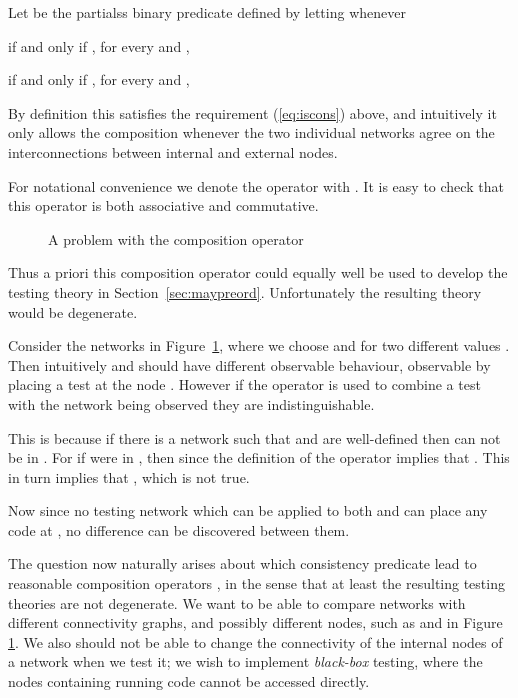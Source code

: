 \documentclass{LMCS}
\begin{document}
\begin{exa}\label{ex:mas.op}
  Let  be the partialss binary predicate defined by letting 
 whenever
\begin{itemise}
\item 
\item    if and only if 
 , for every  and , 
 \item  if and only if 
 , for every  and ,
\end{itemise}

\noindent By definition this satisfies the requirement (\ref{eq:iscons}) above,
and intuitively it only allows the composition whenever the two
individual networks agree on the interconnections between internal and external nodes.

For notational convenience we denote the operator  with 
. It is easy to check that this operator 
is both associative and commutative.
\end{exa}



\begin{figure}[t]                                 


  \caption{A problem with the  composition operator}
\label{fig:counterex} 
 
\end{figure}

Thus a priori this composition operator  could equally well 
be used to develop the testing theory in Section~\ref{sec:maypreord}. 
Unfortunately the resulting theory would be degenerate.
\begin{exa}
  Consider the networks  in Figure~\ref{fig:counterex}, 
  where we choose  and  for two different 
  values .
Then intuitively  and  
  should have different observable behaviour, observable by placing 
  a test at the node . However if the operator  is used 
  to combine a test with the network being observed they are 
  indistinguishable. 

   This is because if there is a  network   such that
   and  are well-defined then  can not be in
  .  For if  were in , then
  since  the definition of the operator
  implies that .  This in turn implies
  that , which is not true.

  Now since no testing network which can be applied to both  and  can place any code at , no difference
  can be discovered between them.
 \end{exa}

The question now naturally arises about which consistency predicate  
lead to reasonable composition operators  , in the sense 
that at least the resulting testing theories are not degenerate. 
We want to be able to compare networks with different connectivity graphs, and
possibly different nodes, such as  and  in Figure \ref{fig:counterex}. 
We also should not be able to change the
connectivity of the internal nodes of a network when we test it; we wish to implement
\emph{black-box} testing, where the nodes containing running code cannot 
be accessed directly.  
\end{document}
